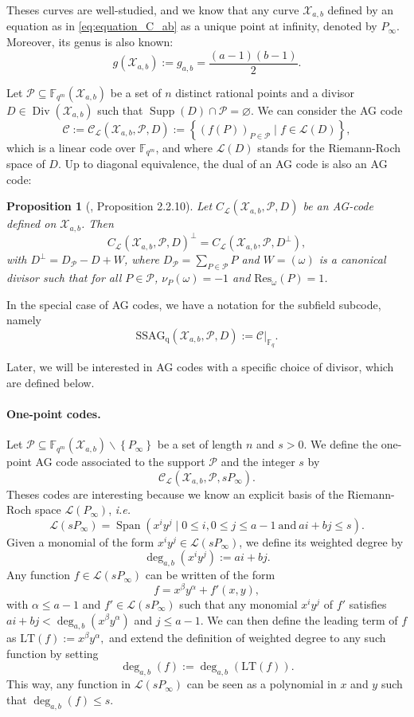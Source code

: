 \documentclass[a4paper]{article}
\newtheorem{proposition}[thm]{Proposition}
\theoremstyle{definition}
\theoremstyle{remark}
\newcommand{\calP}{\mathcal{P}}
\newcommand{\calL}{\mathcal{L}}
\newcommand{\calC}{\mathcal{C}}
\newcommand{\calX}{\mathcal{X}}
\newcommand{\fqm}{\mathbb{F}_{q^m}}
\newcommand{\fq}{\mathbb{F}_{q}}
\newcommand{\set}[1]{\left\{#1\right\}}
\newcommand{\Span}[1]{\operatorname{Span}\left(#1\right)}
\newcommand{\Supp}{\operatorname{Supp}}
\newcommand{\Div}{\operatorname{Div}}
\newcommand{\ssag}[1]{\operatorname{SSAG_{q}}\left(#1\right)}
\newcommand{\degab}[1]{\deg_{a,b}\left(#1\right)}
\begin{document}
\noindent Theses curves are well-studied, and we know that any curve $\calX_{a,b}$ defined by an equation as in \eqref{eq:equation_C_ab} as a unique point at infinity, denoted by $P_{\infty}$. Moreover, its genus is also known:
 $$g(\calX_{a,b}) := g_{a,b} = \dfrac{(a-1)(b-1)}{2}.$$

Let $\calP \subseteq \fqm(\calX_{a,b})$ be a set of $n$ distinct rational points and a divisor $D \in \Div(\calX_{a,b})$ such that $\Supp(D) \cap \calP = \varnothing$.
We can consider the AG code 
$$\calC := \calC_{\calL}(\calX_{a,b},\calP,D) := \set{\left(f(P)\right)_{P \in \calP} \mid f \in \calL(D)},$$
which is a linear code over $\fqm$, and where $\calL(D)$ stands for the Riemann-Roch space of $D$. Up to diagonal equivalence, the dual of an AG code is also an AG code:

\begin{proposition} [\cite{Sti09}, Proposition 2.2.10] \label{prop:dual_AG_codes}
Let $C_{\calL}(\calX_{a,b},\calP,D)$ be an AG-code defined on $\calX_{a,b}$. Then 
\[C_{\calL}(\calX_{a,b},\calP,D)^{\perp} = C_{\calL}(\calX_{a,b},\calP,D^{\perp}),\]
with $D^{\perp} = D_{\calP}-D+W$, where $D_{\calP} = \sum\limits_{P \in \calP} P$ and $W=(\omega)$ is a canonical divisor such that for all $P \in \calP$, $\nu_P(\omega)=-1$ and $\mathrm{Res}_{\omega}(P)=1$. 
\end{proposition}

\noindent In the special case of AG codes, we have a notation for the subfield subcode, namely
$$\ssag{\calX_{a,b},\calP,D} := \calC|_{\fq}.$$

Later, we will be interested in AG codes with a specific choice of divisor, which are defined below.

\paragraph{One-point codes.} Let $\calP \subseteq \fqm(\calX_{a,b}) \backslash \set{P_{\infty}}$ be a set of length $n$ and $s > 0$. We define the one-point AG code associated to the support $\calP$ and the integer $s$ by
$$\calC_{\calL}(\calX_{a,b},\calP,sP_{\infty}).$$
Theses codes are interesting because we know an explicit basis of the Riemann-Roch space $\calL(P_{\infty})$, \emph{i.e.}
\begin{equation} \label{eq:basis_L(sP_inf)}
    \calL(sP_{\infty}) = \Span{x^iy^j \mid 0 \leq i, 0\leq j\leq a-1 \ \mathrm{and} \ ai+bj \leq s}.
\end{equation}
Given a monomial of the form $x^iy^j \in \calL(sP_{\infty})$, we define its weighted degree by
\[ \degab{x^iy^j} := ai+bj.\]
Any function $f \in \calL(sP_{\infty})$ can be written of the form $$f = x^{\beta}y^{\alpha} + f'(x,y),$$
with $\alpha \leq a-1$ and $f' \in \calL(sP_{\infty})$ such that any monomial $x^iy^j$ of $f'$ satisfies $ai+bj < \degab{x^{\beta}y^{\alpha}}$ and $j \leq a-1$. We can then define the leading term of $f$ as $\mathrm{LT}(f) := x^{\beta}y^{\alpha},$ and extend the definition of weighted degree to any such function by setting 
$$\degab{f} := \degab{\mathrm{LT}(f)}.$$
This way, any function in $\calL(sP_\infty)$ can be seen as a polynomial in $x$ and $y$ such that $\degab{f}\leq s$. 
\end{document}
